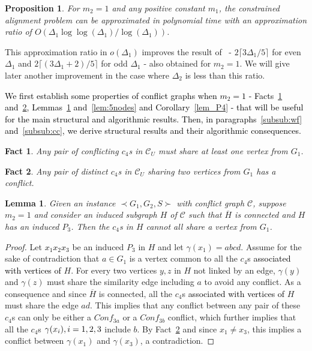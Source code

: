 \documentclass[final]{dmtcs-episciences}
\newtheorem{lemma}[theorem]{Lemma}
\newtheorem{proposition}[theorem]{Proposition}
\newtheorem{fact}{Fact}
\newcommand\mar[1]{\textcolor{black}{#1}}
\begin{document}
\begin{proposition}\label{cor:approxD1}
For $m_2=1$ and any positive constant $m_1$, the constrained alignment problem can be approximated in polynomial time with an approximation ratio of
$O(\Delta_1\log \log(\Delta_1)/\log(\Delta_1))$.
\end{proposition}
 
This approximation ratio in $o(\Delta_1)$ improves the result of~\citet{Fertin200990} \-- $2\lceil3\Delta_1/5\rceil$
for even $\Delta_1$ and $2\lceil(3\Delta_1+2)/5\rceil$ for odd 
$\Delta_1$ \-- also obtained for $m_2=1$. We will give later another improvement in the case where $\Delta_2$ is less than this ratio. 

\mar{We first establish some  properties of conflict graphs when $m_2=1$ \-- Facts~\ref{onenode} and~\ref{twonodes}, Lemmas~\ref{lem_H} and~\ref{lem:5nodes} and Corollary~\ref{lem_P4} \--  that will be useful for the main structural and algorithmic results. Then, in paragraphs~\ref{subsub:wf} and~\ref{subsub:cc}, we derive structural results and their algorithmic consequences. }


\begin{fact}
\label{onenode}
Any pair of conflicting $c_4$s in $\mathcal{C}_U$ must share at least one vertex from $G_1$.
\end{fact}

\begin{fact}
\label{twonodes}
Any pair of distinct $c_4$s in $\mathcal{C}_U$ sharing two vertices from $G_1$ has a conflict.
\end{fact} 


\begin{lemma}
\label{lem_H}
Given an instance $\prec G_1,G_2,S \succ$ with conflict graph $\mathcal{C}$, suppose $m_2=1$ and consider an induced subgraph $H$  of $\mathcal{C}$ such that $\overline{H}$ is connected and $H$ has an induced $P_3$.
Then the $c_4$s in $H$ cannot all share a vertex from $G_1$.
\end{lemma}

\begin{proof}
Let \mar{$x_1x_2x_3$} be an induced $P_3$ in $H$  and let $\gamma(x_1)=abcd$. 
Assume for the sake of contradiction that $a\in G_1$ is a vertex common to all the $c_4$s \mar{associated with vertices of} $H$. For every two vertices $y,z$ in $H$ not linked by an edge, $\gamma(y)$ and $\gamma(z)$ must share the similarity edge including $a$ to avoid any conflict. As a consequence and since  $\overline{H}$ is connected, all 
the $c_4$s \mar{associated with vertices of} $H$ must share the edge $ad$. 
This implies that  any conflict between any pair of these $c_4$s can only be either a
$Conf_{3a}$ or a $Conf_{3b}$ conflict, which further implies that all the $c_4$s $\gamma(x_i), \mar{i=1,2,3}$ include  $b$.
By Fact~\ref{twonodes} and since $x_1\neq x_3$, this implies a conflict between $\gamma(x_1)$ and $\gamma(x_3)$, a contradiction.\end{proof}
\end{document}
